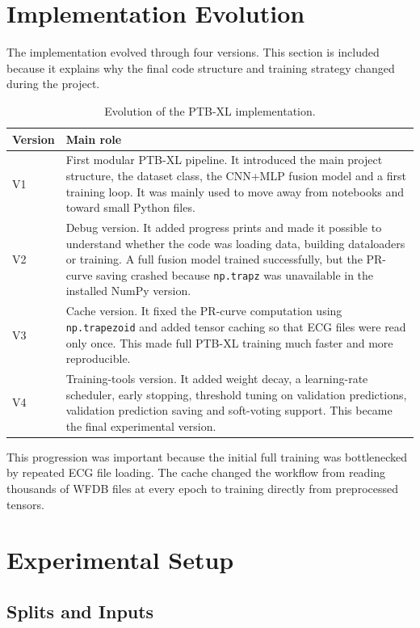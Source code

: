 \documentclass[11pt,a4paper]{article}
\newcommand{\code}[1]{\texttt{#1}}
\begin{document}
\section{Implementation Evolution}

The implementation evolved through four versions. This section is included because it explains why the final code structure and training strategy changed during the project.

\begin{table}[H]
\centering
\caption{Evolution of the PTB-XL implementation.}
\begin{tabular}{p{1.8cm}p{12cm}}
\toprule
\textbf{Version} & \textbf{Main role} \\
\midrule
V1 & First modular PTB-XL pipeline. It introduced the main project structure, the dataset class, the CNN+MLP fusion model and a first training loop. It was mainly used to move away from notebooks and toward small Python files. \\
V2 & Debug version. It added progress prints and made it possible to understand whether the code was loading data, building dataloaders or training. A full fusion model trained successfully, but the PR-curve saving crashed because \code{np.trapz} was unavailable in the installed NumPy version. \\
V3 & Cache version. It fixed the PR-curve computation using \code{np.trapezoid} and added tensor caching so that ECG files were read only once. This made full PTB-XL training much faster and more reproducible. \\
V4 & Training-tools version. It added weight decay, a learning-rate scheduler, early stopping, threshold tuning on validation predictions, validation prediction saving and soft-voting support. This became the final experimental version. \\
\bottomrule
\end{tabular}
\label{tab:versions}
\end{table}

This progression was important because the initial full training was bottlenecked by repeated ECG file loading. The cache changed the workflow from reading thousands of WFDB files at every epoch to training directly from preprocessed tensors.

\section{Experimental Setup}

\subsection{Splits and Inputs}
\end{document}
